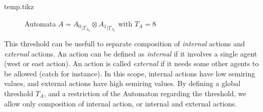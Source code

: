 \documentclass{article}
\begin{document}
\begin{filecontents*}{temp.tikz}
\end{filecontents*}
\begin{figure}[htb]
\centering
\resizebox{10cm}{!}{}
\caption{Automata $A={A_0}_{|T_{A_0}} \otimes {A_1}_{|T_{A_1}}$ with $T_{A}=8$}\label{fig:myfigure}
\end{figure}

This threshold can be usefull to separate composition of \textit{internal} actions and \textit{external} actions. An action can be defined as \textit{internal} if it involves a single agent (west or east action). An action is called \textit{external} if it needs some other agents to be allowed (catch for instance). In this scope, internal actions have low semiring values, and external actions have high semiring values. By defining a global threshold $T_A$, and a restriction of the Automaton regarding the threshold, we allow only composition of internal action, or internal and external actions.
\end{document}
